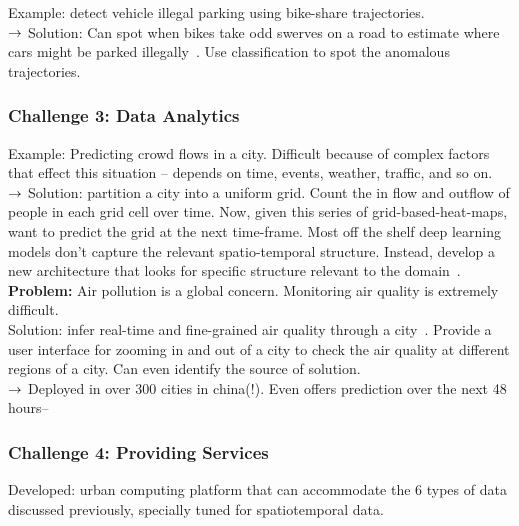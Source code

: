 Example: detect vehicle illegal parking using bike-share trajectories. \\

$\rightarrow$ Solution: Can spot when bikes take odd swerves on a road to estimate where cars might be parked illegally~\cite{he2018detecting}. Use classification to spot the anomalous trajectories. \\


\subsubsection{Challenge 3: Data Analytics}

Example: Predicting crowd flows in a city. Difficult because of complex factors that effect this situation -- depends on time, events, weather, traffic, and so on. \\

$\rightarrow$ Solution: partition a city into a uniform grid. Count the in flow and outflow of people in each grid cell over time. Now, given this series of grid-based-heat-maps, want to predict the grid at the next time-frame. Most off the shelf deep learning models don't capture the relevant spatio-temporal structure. Instead, develop a new architecture that looks for specific structure relevant to the domain~\cite{zhang2017deep}. \\


{\bf Problem:} Air pollution is a global concern. Monitoring air quality is extremely difficult. \\

Solution: infer real-time and fine-grained air quality through a city~\cite{zheng2013u}. Provide a user interface for zooming in and out of a city to check the air quality at different regions of a city. Can even identify the source of solution. \\

$\rightarrow$ Deployed in over 300 cities in china(!). Even offers prediction over the next 48 hours--

\subsubsection{Challenge 4: Providing Services}

Developed: urban computing platform that can accommodate the 6 types of data discussed previously, specially tuned for spatiotemporal data. \\

